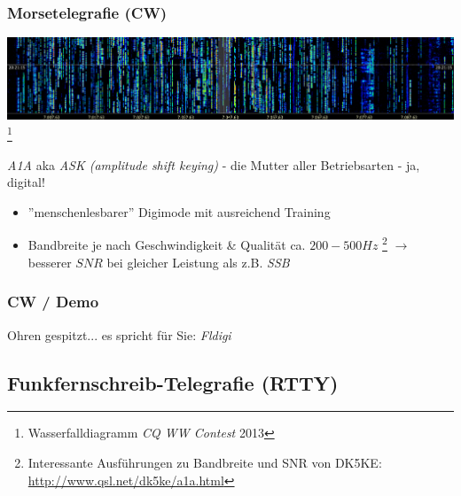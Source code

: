 \begin{frame}
    \frametitle{Morsetelegrafie (CW)}

    \begin{center}
        \includegraphics[width=1\textwidth]{e16/CQWW_2013_CW_Waterfall.png}
        \footnote{Wasserfalldiagramm \emph{CQ WW Contest} 2013}
    \end{center}

    \emph{A1A} aka \emph{ASK (amplitude shift keying)} - die Mutter aller
    Betriebsarten - ja, digital!

    \begin{itemize}
        \item ''menschenlesbarer'' Digimode mit ausreichend Training
        \item Bandbreite je nach Geschwindigkeit \& Qualität ca. $200-500 Hz$
              \footnote{Interessante Ausführungen zu Bandbreite und SNR von
              DK5KE: \url{http://www.qsl.net/dk5ke/a1a.html}}
              $\rightarrow$ besserer $SNR$ bei gleicher Leistung als z.B. \emph{SSB}
    \end{itemize}

\end{frame}

\begin{frame}
    \frametitle{CW / Demo}

    \Large{Ohren gespitzt... es spricht für Sie: \emph{Fldigi}}

\end{frame}

\subsection[RTTY]{Funkfernschreib-Telegrafie (RTTY)}

